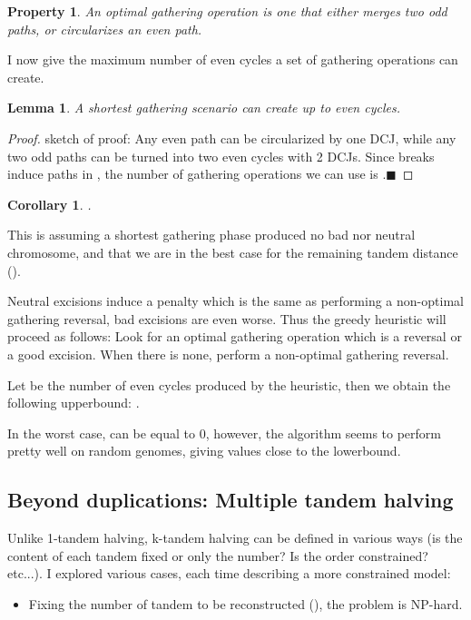 \documentclass[11pt,final,twoside,nofrench]{thlifl}
\newcommand{\qed}{\ensuremath{\blacksquare}}
\newtheorem{property}{Property}
\newtheorem{proof}{Proof}
\newtheorem{lemma}{Lemma}
\newtheorem{corollary}{Corollary}
\begin{document}
{\begin{property}
An optimal gathering operation is one that either merges two odd paths, or circularizes an even path.
\end{property}

I now give the maximum number of even cycles a set of  gathering operations can create.

\begin{lemma}
A shortest gathering scenario can create up to  even cycles.
\end{lemma}
\begin{proof}
sketch of proof: Any even path can be circularized by one DCJ, while any two odd paths can be turned into two even cycles with 2 DCJs. Since  breaks induce  paths in , the number of gathering operations we can use is .\qed
\end{proof}

\begin{corollary}
\label{cor:lb}
.
\end{corollary}

This is assuming a shortest gathering phase produced no bad nor neutral chromosome, and that we are in the best case for the remaining tandem distance ().

Neutral excisions induce a penalty which is the same as performing a
non-optimal gathering reversal, bad excisions are even
worse. Thus the greedy heuristic will proceed as follows: Look
for an optimal gathering operation which is a reversal or a good
excision. When there is none, perform a non-optimal gathering
reversal. 

Let  be the number of even cycles produced by the heuristic, then we obtain the following upperbound: .

In the worst case,  can be equal to 0, however, the algorithm
seems to perform pretty well on random genomes, giving values close to the lowerbound.

\subsection{Beyond duplications: Multiple tandem halving}
\label{sec:mth}

Unlike 1-tandem halving, k-tandem halving can be defined in various
ways (is the content of each tandem fixed or only the number? Is the order constrained? etc...). I explored various cases, each time describing a more constrained model:

\begin{itemize}
\item Fixing the number of tandem to be reconstructed (), the problem is NP-hard. 


\end{itemize}}
\end{document}

